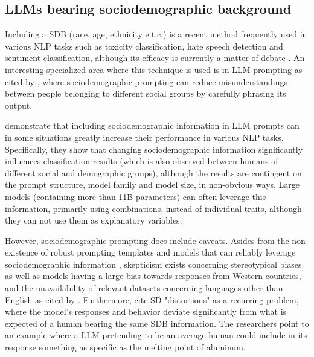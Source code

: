 \subsection{LLMs bearing sociodemographic background}
\label{sec:related:sociodemographic}

Including a \ac{SDB} (race, age, ethnicity e.t.c.) is a recent method frequently used in various \ac{NLP} tasks such as toxicity classification, hate speech detection and sentiment classification, although its efficacy is currently a matter of debate \cite{beck-etal-2024-sensitivity}. An interesting specialized area where this technique is used is in LLM prompting \cite{hwang-etal-2023-aligning, durmus2024measuringrepresentationsubjectiveglobal} as cited by \cite{beck-etal-2024-sensitivity}, where sociodemographic prompting can reduce misunderstandings between people belonging to different social groups by carefully phrasing its output. 

\cite{beck-etal-2024-sensitivity} demonstrate that including sociodemographic information in LLM prompts can in some situations greatly increase their performance in various NLP tasks. Specifically, they show that changing sociodemographic information significantly influences classification results (which is also observed between humans of different social and demographic groups), although the results are contingent on the prompt structure, model family and model size, in non-obvious ways. Large models (containing more than 11B parameters) can often leverage this information, primarily using combinations, instead of individual traits, although they can not use them as explanatory variables.

However, sociodemographic prompting does include caveats. Asides from the non-existence of robust prompting templates and models that can reliably leverage sociodemographic information \cite{beck-etal-2024-sensitivity}, skepticism exists concerning stereotypical biases \cite{cheng-etal-2023-marked, deshpande-etal-2023-toxicity} as well as models having a large bias towards responses from Western countries, and the unavailability of relevant datasets concerning languages other than English \cite{pmlr-v202-santurkar23a, durmus2024measuringrepresentationsubjectiveglobal, santy-etal-2023-nlpositionality} as cited by \cite{beck-etal-2024-sensitivity}. Furthermore, \cite{aher2023usinglargelanguagemodels} cite SD "distortions" as a recurring problem, where the model's responses and behavior deviate significantly from what is expected of a human bearing the same \ac{SDB} information. The researchers point to an example where a LLM pretending to be an average human could include in its response something as specific as the melting point of aluminum.


